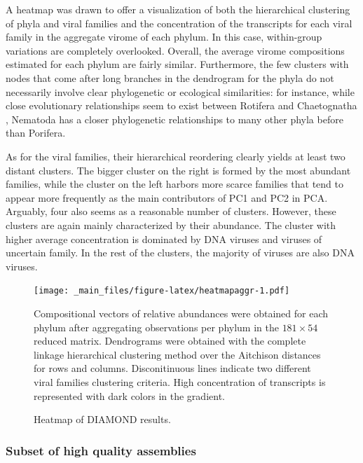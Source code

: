 \documentclass[
  openany]{book}
\begin{document}
A heatmap was drawn to offer a visualization of both the hierarchical clustering of phyla and viral families and the concentration of the transcripts for each viral family in the aggregate virome of each phylum. In this case, within-group variations are completely overlooked. Overall, the average virome compositions estimated for each phylum are fairly similar. Furthermore, the few clusters with nodes that come after long branches in the dendrogram for the phyla do not necessarily involve clear phylogenetic or ecological similarities: for instance, while close evolutionary relationships seem to exist between Rotifera and Chaetognatha \autocite{Frobius2017}, Nematoda has a closer phylogenetic relationships to many other phyla before than Porifera.

As for the viral families, their hierarchical reordering clearly yields at least two distant clusters. The bigger cluster on the right is formed by the most abundant families, while the cluster on the left harbors more scarce families that tend to appear more frequently as the main contributors of PC1 and PC2 in PCA. Arguably, four also seems as a reasonable number of clusters. However, these clusters are again mainly characterized by their abundance. The cluster with higher average concentration is dominated by DNA viruses and viruses of uncertain family. In the rest of the clusters, the majority of viruses are also DNA viruses.

\begin{figure}[!htbp]

\texttt{[image: \_main\_files/figure-latex/heatmapaggr-1.pdf]}

\caption{Heatmap of DIAMOND results.\label{fig:heatmap}}
Compositional vectors of relative abundances were obtained for each phylum after aggregating observations per phylum in the $181\times54$ reduced matrix. Dendrograms were obtained with the complete linkage hierarchical clustering method over the Aitchison distances for rows and columns. Disconitinuous lines indicate two different viral families clustering criteria. High concentration of transcripts is represented with dark colors in the gradient.
\end{figure}

\hypertarget{subset-of-high-quality-assemblies}{%
\subsubsection{Subset of high quality assemblies}\label{subset-of-high-quality-assemblies}}
\end{document}
